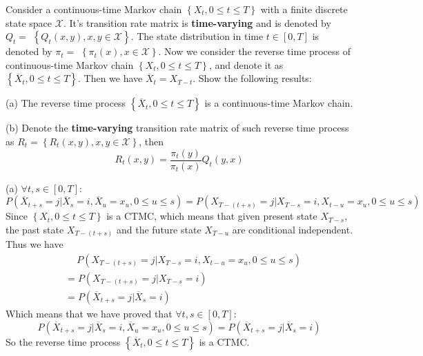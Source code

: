 \begin{homeworkProblem}

Consider a continuous-time Markov chain $\left\{X_t, 0 \leq t \leq T\right\}$ with a finite discrete state space $\mathcal{X}$. It's transition rate matrix is \textbf{time-varying} and is denoted by $Q_t=$ $\left\{Q_t(x, y), x, y \in \mathcal{X}\right\}$. The state distribution in time $t \in[0, T]$ is denoted by $\pi_t=$ $\left\{\pi_t(x), x \in \mathcal{X}\right\}$. Now we consider the reverse time process of continuous-time Markov chain $\left\{X_t, 0 \leq t \leq T\right\}$, and denote it as $\left\{\overline{X}_t, 0 \leq t \leq T\right\}$. Then we have $\overline{X}_t=X_{T-t}$. Show the following results:

(a) The reverse time process $\left\{\overline{X}_t, 0 \leq t \leq T\right\}$ is a continuous-time Markov chain.

(b) Denote the \textbf{time-varying} transition rate matrix of such reverse time process as $R_t=\left\{R_t(x, y), x, y \in \mathcal{X}\right\}$, then
$$R_t(x, y)=\frac{\pi_t(y)}{\pi_t(x)} Q_t(y, x)$$

\solution

(a) $\forall t,s\in[0,T]$:
$$P\left(\overline{X}_{t+s}=j | \overline{X}_s=i, \overline{X}_u=x_u, 0\leq u\leq s\right)=P\left(X_{T-(t+s)}=j | X_{T-s}=i, X_{t-u}=x_u, 0\leq u\leq s\right)$$
Since $\left\{X_t, 0 \leq t \leq T\right\}$ is a CTMC, which means that given present state $X_{T-s}$, the past state $X_{T-(t+s)}$ and the future state $X_{T-u}$ are conditional independent. Thus we have
\begin{align*}
&\quad\ P\left(X_{T-(t+s)}=j | X_{T-s}=i, X_{t-u} =x_u, 0\leq u\leq s\right) \\
&= P\left(X_{T-(t+s)}=j | X_{T-s}=i\right) \\
&= P\left(\overline{X}_{t+s}=j | \overline{X}_s=i\right)
\end{align*}
Which means that we have proved that $\forall t,s\in[0,T]$:
$$P\left(\overline{X}_{t+s}=j | \overline{X}_s=i, \overline{X}_u=x_u, 0\leq u\leq s\right)=P\left(\overline{X}_{t+s}=j | \overline{X}_s=i\right)$$
So the reverse time process $\left\{\overline{X}_t, 0 \leq t \leq T\right\}$ is a CTMC.


\end{homeworkProblem}
